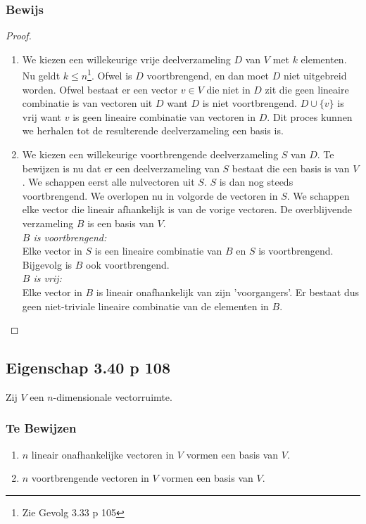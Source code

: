 \documentclass[lineaire_algebra_oplossingen.tex]{subfiles}
\begin{document}
\subsubsection*{Bewijs}
\begin{proof}
\begin{enumerate}
\item
We kiezen een willekeurige vrije deelverzameling $D$ van $V$ met $k$ elementen. Nu geldt $k\le n$\footnote{Zie Gevolg 3.33 p 105}. Ofwel is $D$ voortbrengend, en dan moet $D$ niet uitgebreid worden. Ofwel bestaat er een vector $v\in V$ die niet in $D$ zit die geen lineaire combinatie is van vectoren uit $D$ want $D$ is niet voortbrengend. $D \cup \{v\}$ is vrij want $v$ is geen lineaire combinatie van vectoren in $D$. Dit proces kunnen we herhalen tot de resulterende deelverzameling een basis is.
\item
We kiezen een willekeurige voortbrengende deelverzameling $S$ van $D$. Te bewijzen is nu dat er een deelverzameling van $S$ bestaat die een basis is van $V$. We schappen eerst alle nulvectoren uit $S$. $S$ is dan nog steeds voortbrengend. We overlopen nu in volgorde de vectoren in $S$. We schappen elke vector die lineair afhankelijk is van de vorige vectoren. De overblijvende verzameling $B$ is een basis van $V$.\\
\emph{$B$ is voortbrengend:}\\
Elke vector in $S$ is een lineaire combinatie van $B$ en $S$ is voortbrengend. Bijgevolg is $B$ ook voortbrengend.\\
\emph{$B$ is vrij:}\\
Elke vector in $B$ is lineair onafhankelijk van zijn 'voorgangers'. Er bestaat dus geen niet-triviale lineaire combinatie van de elementen in $B$.
\end{enumerate}
\end{proof}


\subsection{Eigenschap 3.40 p 108}
\label{3.40}
Zij $V$ een $n$-dimensionale vectorruimte.

\subsubsection*{Te Bewijzen}
\begin{enumerate}
\item $n$ lineair onafhankelijke vectoren in $V$ vormen een basis van $V$.
\item $n$ voortbrengende vectoren in $V$ vormen een basis van $V$.
\end{enumerate}
\end{document}
